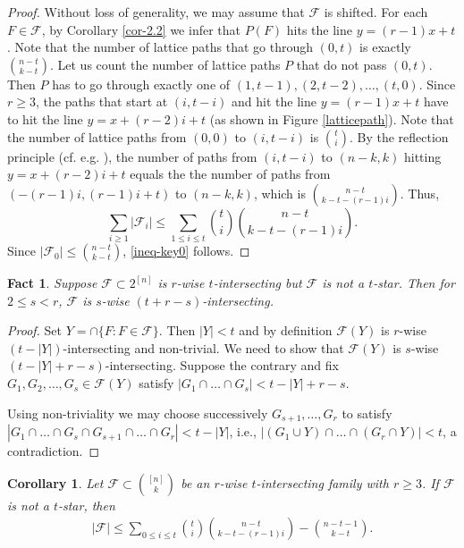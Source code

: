 \documentclass[11pt,a4paper]{article}
\newtheorem{false statement}{False statement}
\newtheorem{cor}[thm]{Corollary}
\newtheorem{fact}[thm]{Fact}
\theoremstyle{definition}
\def\hf{\mathcal{F}}
\begin{document}
\begin{proof}
Without loss of generality, we may assume that $\hf$ is shifted.
 For each $F\in \hf$, by Corollary \ref{cor-2.2} we infer that $P(F)$ hits the line $y=(r-1)x+t$. Note that the number of lattice paths that go through $(0,t)$ is exactly $\binom{n-t}{k-t}$. Let us count the number of lattice paths $P$ that do not pass $(0,t)$. Then $P$ has to go through exactly one of $(1,t-1),(2,t-2),\ldots,(t,0)$.  Since $r\geq 3$, the paths that start at $(i,t-i)$ and hit the line $y=(r-1)x+t$ have to  hit the line $y=x+(r-2)i+t$ (as shown in Figure \ref{latticepath}). Note that the number of lattice paths from $(0,0)$ to $(i,t-i)$ is $\binom{t}{i}$. By the reflection principle (cf. e.g. \cite{F78}), the number of paths from $(i,t-i)$ to $(n-k,k)$ hitting $y=x+(r-2)i+t$ equals the the number of paths from $(-(r-1)i,(r-1)i+t)$ to $(n-k,k)$, which is
  $\binom{n-t}{k-t-(r-1)i}$. Thus,
 \[
\sum_{i\geq 1} |\hf_i|  \leq \sum_{1\leq i\leq t} \binom{t}{i}\binom{n-t}{k-t-(r-1)i}.
 \]
Since $|\hf_0|\leq \binom{n-t}{k-t}$, \eqref{ineq-key0} follows.
\end{proof}

\begin{fact}\label{fact-3.1}
Suppose $\hf\subset 2^{[n]}$ is $r$-wise $t$-intersecting but $\hf$ is not a $t$-star. Then for $2\leq s<r$, $\hf$ is $s$-wise $(t+r-s)$-intersecting.
\end{fact}
\begin{proof}
Set $Y=\cap \{F\colon F\in \hf\}$. Then $|Y|<t$ and by definition $\hf(Y)$ is $r$-wise $(t-|Y|)$-intersecting and non-trivial. We need to show that $\hf(Y)$ is $s$-wise $(t-|Y|+r-s)$-intersecting. Suppose the contrary and fix $G_1,G_2,\ldots,G_s\in \hf(Y)$ satisfy $|G_1\cap \ldots \cap G_s|<t-|Y|+r-s$.

Using non-triviality we may choose successively $G_{s+1},\ldots,G_r$ to satisfy $|G_1\cap \ldots \cap G_s\cap G_{s+1}\cap \ldots\cap G_r|<t-|Y|$, i.e., $|(G_1\cup Y)\cap \ldots\cap (G_r\cap Y)|<t$, a contradiction.
\end{proof}


\begin{cor}
Let $\hf\subset \binom{[n]}{k}$ be an $r$-wise $t$-intersecting family with $r\geq 3$. If $\hf$ is not a $t$-star, then
\begin{align}\label{ineq-key2}
|\hf|   \leq \sum_{0\leq i\leq t} \binom{t}{i}\binom{n-t}{k-t-(r-1)i} - \binom{n-t-1}{k-t}.
\end{align}
\end{cor}
\end{document}
